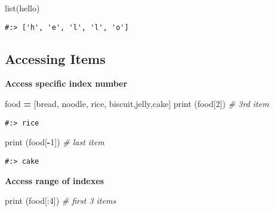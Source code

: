 \documentclass[
]{book}
\newenvironment{Shaded}{\begin{snugshade}}{\end{snugshade}}
\newcommand{\BuiltInTok}[1]{#1}
\newcommand{\CommentTok}[1]{\textcolor[rgb]{0.37,0.37,0.37}{\textit{#1}}}
\newcommand{\DecValTok}[1]{\textcolor[rgb]{0.06,0.06,0.06}{#1}}
\newcommand{\NormalTok}[1]{#1}
\newcommand{\OperatorTok}[1]{\textcolor[rgb]{0.43,0.43,0.43}{\textbf{#1}}}
\newcommand{\StringTok}[1]{\textcolor[rgb]{0.5,0.5,0.5}{#1}}
\begin{document}
\begin{Shaded}
\begin{Highlighting}[]
\BuiltInTok{list}\NormalTok{(}\StringTok{\textquotesingle{}hello\textquotesingle{}}\NormalTok{)}
\end{Highlighting}
\end{Shaded}

\begin{verbatim}
#:> ['h', 'e', 'l', 'l', 'o']
\end{verbatim}

\hypertarget{accessing-items}{%
\subsection{Accessing Items}\label{accessing-items}}

\textbf{Access specific index number}

\begin{Shaded}
\begin{Highlighting}[]
\NormalTok{food }\OperatorTok{=}\NormalTok{ [}\StringTok{\textquotesingle{}bread\textquotesingle{}}\NormalTok{, }\StringTok{\textquotesingle{}noodle\textquotesingle{}}\NormalTok{, }\StringTok{\textquotesingle{}rice\textquotesingle{}}\NormalTok{, }\StringTok{\textquotesingle{}biscuit\textquotesingle{}}\NormalTok{,}\StringTok{\textquotesingle{}jelly\textquotesingle{}}\NormalTok{,}\StringTok{\textquotesingle{}cake\textquotesingle{}}\NormalTok{]}
\BuiltInTok{print}\NormalTok{ (food[}\DecValTok{2}\NormalTok{])  }\CommentTok{\# 3rd item}
\end{Highlighting}
\end{Shaded}

\begin{verbatim}
#:> rice
\end{verbatim}

\begin{Shaded}
\begin{Highlighting}[]
\BuiltInTok{print}\NormalTok{ (food[}\OperatorTok{{-}}\DecValTok{1}\NormalTok{]) }\CommentTok{\# last item}
\end{Highlighting}
\end{Shaded}

\begin{verbatim}
#:> cake
\end{verbatim}

\textbf{Access range of indexes}

\begin{Shaded}
\begin{Highlighting}[]
\BuiltInTok{print}\NormalTok{ (food[:}\DecValTok{4}\NormalTok{])     }\CommentTok{\# first 3 items}
\end{Highlighting}
\end{Shaded}
\end{document}
